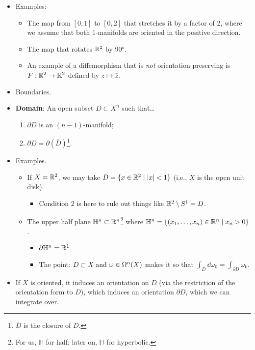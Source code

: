 \documentclass[../notes.tex]{subfiles}
\begin{document}
\begin{itemize}
    \item Examples:
    \begin{itemize}
        \item The map from $[0,1]$ to $[0,2]$ that stretches it by a factor of 2, where we assume that both 1-manifolds are oriented in the positive direction.
        \item The map that rotates $\R^2$ by \ang{90}.
        \item An example of a diffemorphism that is \emph{not} orientation preserving is $F:\R^2\to\R^2$ defined by $z\mapsto\bar{z}$.
    \end{itemize}
    \item Boundaries.
    \item \textbf{Domain}: An open subset $D\subset X^n$ such that\dots
    \begin{enumerate}
        \item $\partial D$ is an $(n-1)$-manifold;
        \item $\partial D=\partial(\overline{D})$\footnote{$\overline{D}$ is the closure of $D$.}.
    \end{enumerate}
    \item Examples.
    \begin{itemize}
        \item If $X=\R^2$, we may take $D=\{x\in\R^2\mid |x|<1\}$ (i.e., $X$ is the open unit disk).
        \begin{itemize}
            \item Condition 2 is here to rule out things like $\R^2\setminus S^1=D$.
        \end{itemize}
        \item The upper half plane $\mathbb{H}^n\subset\R^n$\footnote{For us, $\mathbb{H}$ for half; later on, $\mathbb{H}$ for hyperbolic.} where $\mathbb{H}^n=\{(x_1,\dots,x_n)\in\R^n\mid x_n>0\}$.
        \begin{itemize}
            \item $\partial\mathbb{H}^n=\R^1$.
            \item The point: $D\subset X$ and $\omega\in\ome[n]{X}$ makes it so that $\int_D\dd{\omega_0}=\int_{\partial D}\omega_0$.
        \end{itemize}
    \end{itemize}
    \item If $X$ is oriented, it induces an orientation on $D$ (via the restriction of the orientation form to $D$), which induces an orientation $\partial D$, which we can integrate over.

\end{itemize}
\end{document}
